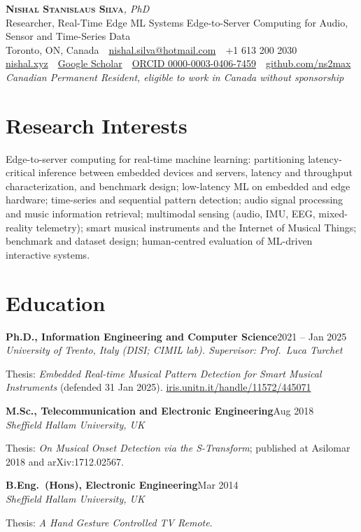 \documentclass[11pt]{article}
\newcommand{\entry}[3]{%
  \par\noindent\textbf{#1}\hfill #2\\
  \noindent\textit{#3}\par\vspace{0.15em}}
\begin{document}
\begin{center}
  {\LARGE \scshape \textbf{Nishal Stanislaus Silva}}{\large \textit{, PhD}}\\[3pt]
  {\small Researcher, Real-Time Edge ML Systems \textbar{} Edge-to-Server Computing for Audio, Sensor and Time-Series Data}\\[3pt]
  {\small Toronto, ON, Canada \,\textbar\, \href{mailto:nishal.silva@hotmail.com}{nishal.silva@hotmail.com} \,\textbar\, +1 613 200 2030}\\[2pt]
  {\small \href{https://nishal.xyz}{nishal.xyz} \,\textbar\,
  \href{https://scholar.google.com/citations?user=pdintvAAAAAJ}{Google Scholar} \,\textbar\,
  \href{https://orcid.org/0000-0003-0406-7459}{ORCID 0000-0003-0406-7459} \,\textbar\,
  \href{https://github.com/ns2max}{github.com/ns2max}}\\[2pt]
  {\footnotesize\textit{Canadian Permanent Resident, eligible to work in Canada without sponsorship}}
\end{center}

\section*{Research Interests}
Edge-to-server computing for real-time machine learning: partitioning latency-critical inference between embedded devices and servers, latency and throughput characterization, and benchmark design; low-latency ML on embedded and edge hardware; time-series and sequential pattern detection; audio signal processing and music information retrieval; multimodal sensing (audio, IMU, EEG, mixed-reality telemetry); smart musical instruments and the Internet of Musical Things; benchmark and dataset design; human-centred evaluation of ML-driven interactive systems.

\section*{Education}
\entry{Ph.D., Information Engineering and Computer Science}{2021 -- Jan 2025}{University of Trento, Italy (DISI; CIMIL lab). Supervisor: Prof.\ Luca Turchet}
\begin{cvlist}
  \item Thesis: \textit{Embedded Real-time Musical Pattern Detection for Smart Musical Instruments} (defended 31 Jan 2025). \href{https://iris.unitn.it/handle/11572/445071}{iris.unitn.it/handle/11572/445071}
\end{cvlist}
\entry{M.Sc., Telecommunication and Electronic Engineering}{Aug 2018}{Sheffield Hallam University, UK}
\begin{cvlist}
  \item Thesis: \textit{On Musical Onset Detection via the S-Transform}; published at Asilomar 2018 and arXiv:1712.02567.
\end{cvlist}
\entry{B.Eng.\ (Hons), Electronic Engineering}{Mar 2014}{Sheffield Hallam University, UK}
\begin{cvlist}
  \item Thesis: \textit{A Hand Gesture Controlled TV Remote}.
\end{cvlist}
\end{document}
